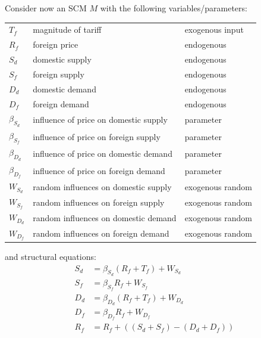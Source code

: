 \newpage
Consider now an SCM $M$ with the following variables/parameters:
\begin{center}\begin{tabular}{lll}
$T_f$     &magnitude of tariff           &exogenous input \\
$R_f$     &foreign price                 &endogenous \\
$S_d$     &domestic supply               &endogenous \\
$S_f$     &foreign supply                &endogenous \\
$D_d$     &domestic demand               &endogenous \\
$D_f$     &foreign demand                &endogenous \\
$\beta_{S_d}$ &influence of price on domestic supply &parameter \\
$\beta_{S_f}$ &influence of price on foreign supply  &parameter \\
$\beta_{D_d}$ &influence of price on domestic demand &parameter \\
$\beta_{D_f}$ &influence of price on foreign demand  &parameter \\
  $W_{S_d}$   &random influences on domestic supply & exogenous random \\
  $W_{S_f}$   &random influences on foreign supply & exogenous random \\
  $W_{D_d}$   &random influences on domestic demand & exogenous random \\
  $W_{D_f}$   &random influences on foreign demand & exogenous random 
\end{tabular}\end{center}
and structural equations:
\begin{align*}
  S_d &= \beta_{S_d} (R_f + T_f) + W_{S_d} \\
  S_f &= \beta_{S_f} R_f + W_{S_f} \\
  D_d &= \beta_{D_d} (R_f + T_f) + W_{D_d} \\
  D_f &= \beta_{D_f} R_f + W_{D_f} \\
  R_f &= R_f + ((S_d + S_f) - (D_d + D_f))
\end{align*}

